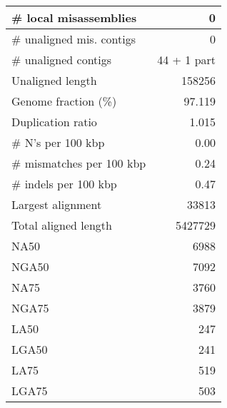 \documentclass[12pt,a4paper]{article}
\begin{document}
\begin{table}[ht]
\begin{center}
\begin{tabular}{|l*{1}{|r}|}
\# local misassemblies & 0 \\ \hline
\# unaligned mis. contigs & 0 \\ \hline
\# unaligned contigs & 44 + 1 part \\ \hline
Unaligned length & 158256 \\ \hline
Genome fraction (\%) & 97.119 \\ \hline
Duplication ratio & 1.015 \\ \hline
\# N's per 100 kbp & 0.00 \\ \hline
\# mismatches per 100 kbp & 0.24 \\ \hline
\# indels per 100 kbp & 0.47 \\ \hline
Largest alignment & 33813 \\ \hline
Total aligned length & 5427729 \\ \hline
NA50 & 6988 \\ \hline
NGA50 & 7092 \\ \hline
NA75 & 3760 \\ \hline
NGA75 & 3879 \\ \hline
LA50 & 247 \\ \hline
LGA50 & 241 \\ \hline
LA75 & 519 \\ \hline
LGA75 & 503 \\ \hline
\end{tabular}
\end{center}
\end{table}
\end{document}
